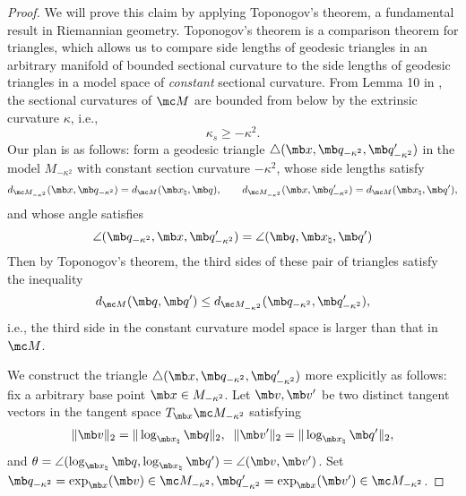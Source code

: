 \begin{proof}
    We will prove this claim by applying Toponogov's theorem, a fundamental result in Riemannian geometry. Toponogov's theorem is a comparison theorem for triangles, which allows us to compare side lengths of geodesic triangles in an arbitrary manifold of bounded sectional curvature to the side lengths of geodesic triangles in a model space of {\em constant} sectional curvature. 
    From Lemma 10 in \cite{yan2023tpopt}, the sectional curvatures of $\mc M$ are bounded from below by the extrinsic curvature $\kappa$, i.e.,
    \begin{equation}
        \kappa_s \geq -\kappa^2.
    \end{equation}
    Our plan is as follows: form a geodesic triangle $\triangle(\mb x, \mb q_{-\kappa^2}, \mb q'_{-\kappa^2} )$ in the model $M_{-\kappa^2}$ with constant section curvature $-\kappa^2$, whose side lengths satisfy
    \begin{equation}
        d_{\mc M_{-\kappa^2}}(\mb x, \mb q_{-\kappa^2}) = d_{\mc M}(\mb x_\natural, \mb q), \qquad d_{\mc M_{-\kappa^2}}(\mb x, \mb q'_{-\kappa^2}) = d_{\mc M}(\mb x_\natural, \mb q'),
    \end{equation}
    and whose angle satisfies 
    \begin{equation}
    \angle(\mb q_{-\kappa^2},\mb x, \mb q'_{-\kappa^2}) = \angle(\mb q,\mb x_\natural, \mb q')
    \end{equation} 
    Then by Toponogov's theorem, the third sides of these pair of triangles satisfy the inequality 
    \begin{equation}
    d_{\mc M}(\mb q,\mb q') \le d_{\mc M_{-\kappa^2}}( \mb q_{-\kappa^2}, \mb q'_{-\kappa^2} ), \label{eqn:topo}
    \end{equation} 
    i.e., the third side in the constant curvature model space is larger than that in $\mc M$. 

    We construct the triangle $\triangle( \mb x, \mb q_{-\kappa^2}, \mb q'_{-\kappa^2} )$ more explicitly as follows: fix a arbitrary base point $\mb x \in  M_{-\kappa^2}$. Let $\mb v, \mb v'$ be two distinct tangent vectors in the tangent space $T_{\mb x}\mc M_{-\kappa^2}$ satisfying 
\begin{equation}
    \|\mb v\|_2 = \|\log_{\mb x_\natural} \mb q\|_2, \;\;
    \|\mb v'\|_2 = \|\log_{\mb x_\natural} \mb q'\|_2,
\end{equation}
and $\theta = \angle(\log_{\mb x_\natural} \mb q, \log_{\mb x_\natural} \mb q')=\angle(\mb v, \mb v')$. Set $\mb q_{-\kappa^2} = \exp_{\mb x}(\mb v) \in \mc M_{-\kappa^2}, \mb q_{-\kappa^2}' = \exp_{\mb x}(\mb v') \in \mc M_{-\kappa^2}$. 


\end{proof}
